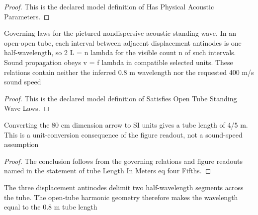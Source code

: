 \begin{proof}
  This is the declared model definition of Has Physical Acoustic Parameters.
\end{proof}
\begin{definition}
  \label{def:physics:phyx-mini-0179:phyxminiproblems-problemphyxmini0179-satisfiesopentubestandingwavelaws}
  Governing laws for the pictured nondispersive acoustic standing wave. In an open-open tube, each interval between adjacent displacement antinodes is one half-wavelength, so 2 L = n lambda for the visible count n of such intervals. Sound propagation obeys v = f lambda in compatible selected units. These relations contain neither the inferred 0.8 m wavelength nor the requested 400 m/s sound speed
\end{definition}
\begin{proof}
  This is the declared model definition of Satisfies Open Tube Standing Wave Laws.
\end{proof}
\begin{lemma}
  \label{lem:physics:phyx-mini-0179:phyxminiproblems-problemphyxmini0179-tubelengthinmeters-eq-fourfifths}
  Converting the 80 cm dimension arrow to SI units gives a tube length of 4/5 m. This is a unit-conversion consequence of the figure readout, not a sound-speed assumption
\end{lemma}
\begin{proof}
  The conclusion follows from the governing relations and figure readouts named in the statement of tube Length In Meters eq four Fifths.
\end{proof}
\begin{lemma}
  \label{lem:physics:phyx-mini-0179:phyxminiproblems-problemphyxmini0179-picturedmode-wavelengthinmeters-eq-fourfifths}
  The three displacement antinodes delimit two half-wavelength segments across the tube. The open-tube harmonic geometry therefore makes the wavelength equal to the 0.8 m tube length
\end{lemma}
